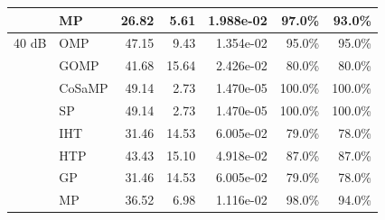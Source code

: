 \begin{table}[!t]
\begin{tabular}{llrrrrr}
 & MP & 26.82 & 5.61 & 1.988e-02 & 97.0\% & 93.0\% \\
\midrule
40 dB & OMP & 47.15 & 9.43 & 1.354e-02 & 95.0\% & 95.0\% \\
 & GOMP & 41.68 & 15.64 & 2.426e-02 & 80.0\% & 80.0\% \\
 & CoSaMP & 49.14 & 2.73 & 1.470e-05 & 100.0\% & 100.0\% \\
 & SP & 49.14 & 2.73 & 1.470e-05 & 100.0\% & 100.0\% \\
 & IHT & 31.46 & 14.53 & 6.005e-02 & 79.0\% & 78.0\% \\
 & HTP & 43.43 & 15.10 & 4.918e-02 & 87.0\% & 87.0\% \\
 & GP & 31.46 & 14.53 & 6.005e-02 & 79.0\% & 78.0\% \\
 & MP & 36.52 & 6.98 & 1.116e-02 & 98.0\% & 94.0\% \\
\bottomrule
\end{tabular}
\end{table}